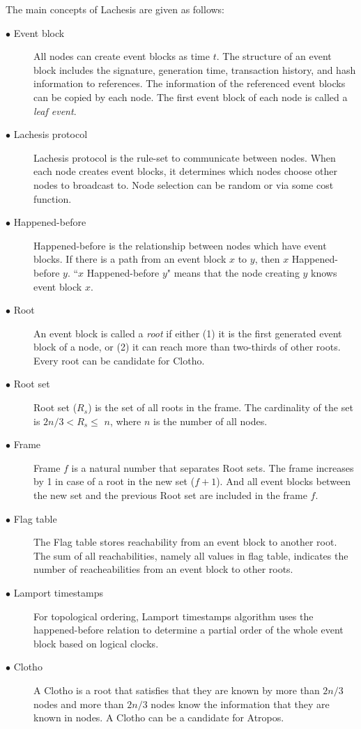 \documentclass[preprint,12pt]{elsarticle}
\begin{document}
The main concepts of Lachesis are given as follows:
\begin{description}
	\item[$\bullet$ Event block] All nodes can create event blocks as time $t$. The structure of an event block includes the signature, generation time, transaction history, and hash information to references. The information of the referenced event blocks can be copied by each node. The first event block of each node is called a \emph{leaf event}.
	\item[$\bullet$ Lachesis protocol] Lachesis protocol is the rule-set to communicate between nodes. When each node creates event blocks, it determines which nodes choose other nodes to broadcast to. Node selection can be random or via some cost function.
	\item[$\bullet$ Happened-before] Happened-before is the relationship between nodes which have event blocks. If there is a path from an event block $x$ to $y$, then $x$ Happened-before $y$. ``$x$ Happened-before $y$" means that the node creating $y$ knows event block $x$.
	\item[$\bullet$ Root] An event block is called a \emph{root} if either (1) it is the first generated event block of a node, or (2) it can reach more than two-thirds of other roots. Every root can be candidate for Clotho.
	\item[$\bullet$ Root set] Root set ($R_s$) is the set of all roots in the frame. The cardinality of the set is $2n/3 < R_s \leq$ $n$, where $n$ is the number of all nodes.  
	\item[$\bullet$ Frame] Frame $f$ is a natural number that separates Root sets. The frame increases by 1 in case of a root in the new set ($f+1$). And all event blocks between the new set and the previous Root set are included in the frame $f$. 
	\item[$\bullet$ Flag table] The Flag table stores reachability from an event block to another root. The sum of all reachabilities, namely all values in flag table, indicates the number of reacheabilities from an event block to other roots. 
	\item[$\bullet$ Lamport timestamps] For topological ordering, Lamport timestamps algorithm uses the happened-before relation to determine a partial order of the whole event block based on logical clocks.
	\item[$\bullet$ Clotho] A Clotho is a root that satisfies that they are known by more than $2n/3$ nodes and more than $2n/3$ nodes know the information that they are known in nodes. A Clotho can be a candidate for Atropos. 

\end{description}
\end{document}
